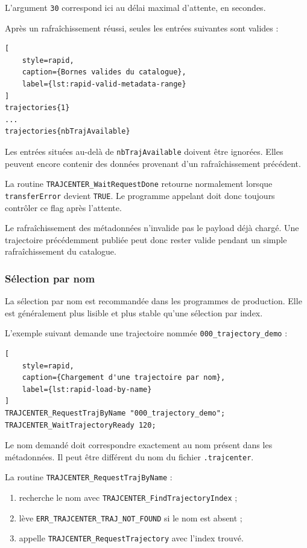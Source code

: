 \documentclass{rapportENSAM}
\begin{document}
L'argument \texttt{30} correspond ici au délai maximal d'attente, en secondes.

Après un rafraîchissement réussi, seules les entrées suivantes sont valides :

\begin{lstlisting}[
    style=rapid,
    caption={Bornes valides du catalogue},
    label={lst:rapid-valid-metadata-range}
]
trajectories{1}
...
trajectories{nbTrajAvailable}
\end{lstlisting}

Les entrées situées au-delà de \texttt{nbTrajAvailable} doivent être ignorées.
Elles peuvent encore contenir des données provenant d'un rafraîchissement
précédent.

La routine \texttt{TRAJCENTER\_WaitRequestDone} retourne normalement lorsque
\texttt{transferError} devient \texttt{TRUE}. Le programme appelant doit donc
toujours contrôler ce flag après l'attente.

Le rafraîchissement des métadonnées n'invalide pas le payload déjà chargé. Une
trajectoire précédemment publiée peut donc rester valide pendant un simple
rafraîchissement du catalogue.


\subsubsection{Sélection par nom}
\label{subsubsec:rapid-trajectory-selection}

La sélection par nom est recommandée dans les programmes de production. Elle
est généralement plus lisible et plus stable qu'une sélection par index.

L'exemple suivant demande une trajectoire nommée
\texttt{000\_trajectory\_demo} :

\begin{lstlisting}[
    style=rapid,
    caption={Chargement d'une trajectoire par nom},
    label={lst:rapid-load-by-name}
]
TRAJCENTER_RequestTrajByName "000_trajectory_demo";
TRAJCENTER_WaitTrajectoryReady 120;
\end{lstlisting}

Le nom demandé doit correspondre exactement au nom présent dans les
métadonnées. Il peut être différent du nom du fichier
\texttt{.trajcenter}.

La routine \texttt{TRAJCENTER\_RequestTrajByName} :

\begin{enumerate}
    \item recherche le nom avec
    \texttt{TRAJCENTER\_FindTrajectoryIndex} ;
    \item lève \texttt{ERR\_TRAJCENTER\_TRAJ\_NOT\_FOUND} si le nom est
    absent ;
    \item appelle \texttt{TRAJCENTER\_RequestTrajectory} avec l'index trouvé.
\end{enumerate}
\end{document}

